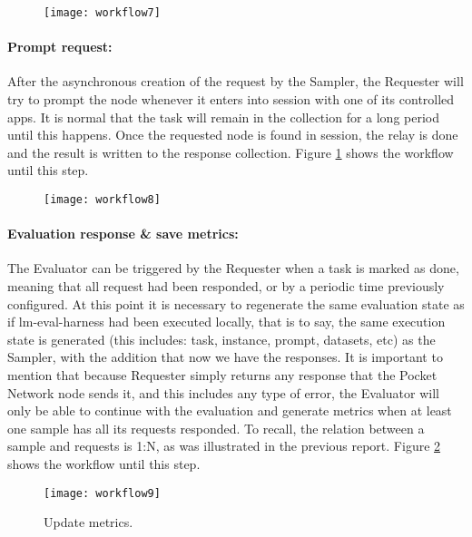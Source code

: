 \begin{figure}[htb!]
    \centering
    \texttt{[image: workflow7]}
    \caption{}
    \label{secb:fig:wf7}
\end{figure}


\paragraph{Prompt request:}
After the asynchronous creation of the request by the Sampler, the Requester will try to prompt the node whenever it enters into session with one of its controlled apps. It is normal that the task will remain in the collection for a long period until this happens. Once the requested node is found in session, the relay is done and the result is written to the response collection.
Figure \ref{secb:fig:wf7} shows the workflow until this step.

\begin{figure}[htb!]
    \centering
    \texttt{[image: workflow8]}
    \caption{}
    \label{secb:fig:wf8}
\end{figure}

\paragraph{Evaluation response \& save metrics:}
The Evaluator can be triggered by the Requester when a task is marked as done, meaning that all request had been responded, or by a periodic time previously configured. 
At this point it is necessary to regenerate the same evaluation state as if lm-eval-harness had been executed locally, that is to say, the same execution state is generated (this includes: task, instance, prompt, datasets, etc) as the Sampler, with the addition that now we have the responses. 
It is important to mention that because Requester simply returns any response that the Pocket Network node sends it, and this includes any type of error, the Evaluator will only be able to continue with the evaluation and generate metrics when at least one sample has all its requests responded. 
To recall, the relation between a sample and requests is 1:N, as was illustrated in the previous report. 
Figure \ref{secb:fig:wf8} shows the workflow until this step.



\begin{figure}[htb!]
    \centering
    \texttt{[image: workflow9]}
    \caption{Update metrics.}
    \label{secb:fig:wf9}
\end{figure}

